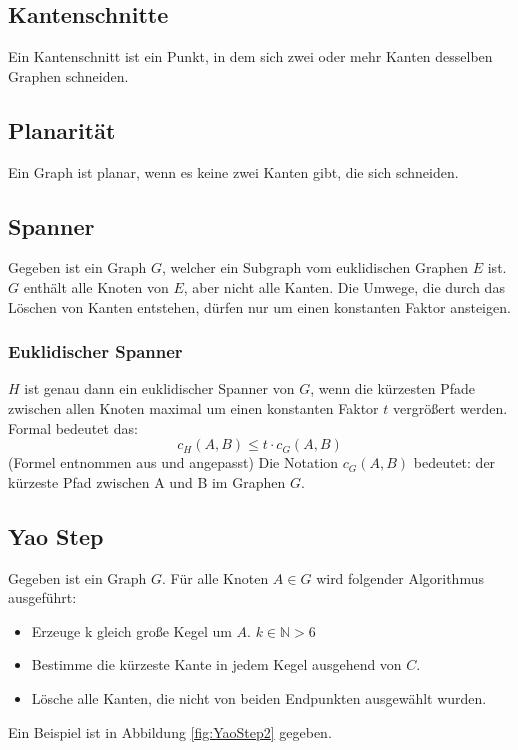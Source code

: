 \documentclass[a4paper,twoside]{IEEEtran}
\begin{document}
\subsection{Kantenschnitte} \label{Kantenschnitt}
Ein Kantenschnitt ist ein Punkt, in dem sich zwei oder mehr Kanten desselben Graphen schneiden.

\subsection{Planarität}
Ein Graph ist planar, wenn es keine zwei Kanten gibt, die sich schneiden.


\subsection{Spanner}
Gegeben ist ein Graph $G $, welcher ein Subgraph vom euklidischen Graphen $E $ ist.
$G $ enthält alle Knoten von $E $, aber nicht alle Kanten. 
Die Umwege, die durch das Löschen von Kanten entstehen, dürfen nur um einen konstanten Faktor ansteigen. 

\subsubsection{Euklidischer Spanner}
$H $ ist genau dann ein euklidischer Spanner von $G $, wenn die kürzesten Pfade zwischen allen Knoten maximal um einen konstanten Faktor $t $ vergrößert werden.
Formal bedeutet das:
\begin{equation}
	c_H(A, B) \leq t \cdot c_G(A, B)
\end{equation}
{\footnotesize (Formel entnommen aus \cite{kanj} und angepasst)}
Die Notation $c_{G}(A, B) $ bedeutet: der kürzeste Pfad zwischen A und B im Graphen $G $.

\subsection{Yao Step}
Gegeben ist ein Graph $G $. Für alle Knoten $A \in G $ wird folgender Algorithmus ausgeführt:
\begin{itemize}
\item Erzeuge k gleich große Kegel um $A $. $k \in \mathds{N} > 6 $
\item Bestimme die kürzeste Kante in jedem Kegel ausgehend von $C $.
\item Lösche alle Kanten, die nicht von beiden Endpunkten ausgewählt wurden.
\end{itemize}
Ein Beispiel ist in Abbildung \ref{fig:YaoStep2} gegeben.
\end{document}
